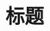 \documentclass[../main.tex]{subfiles} %
\begin{document}
\chapter{标题}

% 

% 

% 

% 

% 

% 

% 

% 

% 

% 
\end{document}
